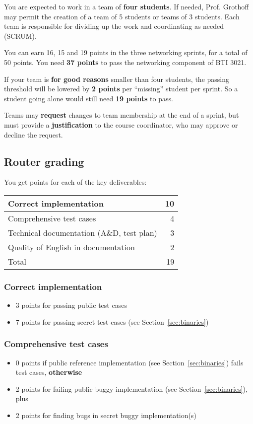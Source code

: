 \documentclass{article}
\begin{document}
You are expected to work in a team of {\bf four students}.  If needed,
Prof. Grothoff may permit the creation of a team of 5 students or
teams of 3 students.  Each team is responsible for dividing up the
work and coordinating as needed (SCRUM).

You can earn 16, 15 and 19 points in the three networking sprints, for
a total of 50 points.  You need {\bf 37 points} to pass the networking
component of BTI 3021.

If your team is {\bf for good reasons} smaller than four students, the
passing threshold will be lowered by {\bf 2 points} per ``missing''
student per sprint.  So a student going alone would still need {\bf 19
  points} to pass.

Teams may {\bf request} changes to team membership at the end of a
sprint, but must provide a {\bf justification} to the course
coordinator, who may approve or decline the request.

\subsection{Router grading}

You get points for each of the key deliverables:
\begin{center}
\begin{tabular}{l|r}
Correct implementation                    & 10 \\ \hline
Comprehensive test cases                  &  4 \\ \hline
Technical documentation (A\&D, test plan) &  3 \\ \hline
Quality of English in documentation       &  2 \\ \hline \hline
Total                                     & 19
\end{tabular}
\end{center}


\subsubsection{Correct implementation}
\begin{itemize}
\item 3 points for passing public test cases
\item 7 points for passing secret test cases (see Section~\ref{sec:binaries})
\end{itemize}

\subsubsection{Comprehensive test cases}
\begin{itemize}
\item 0 points if public reference implementation (see Section~\ref{sec:binaries})
      fails test cases, {\bf otherwise}
\item 2 points for failing public buggy implementation (see Section~\ref{sec:binaries}),
       plus
\item 2 points for finding bugs in secret buggy implementation(s)
\end{itemize}
\end{document}
